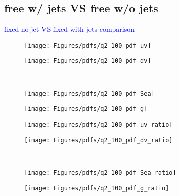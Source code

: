 \subsection{\as free w/ jets VS \as free w/o jets}
\label{subsec:asthunc}

\begin{center}
 \textcolor{blue}{\as fixed no jet VS \as fixed with jets comparison}
\end{center}
\begin{figure}[t]
 \begin{center}
\begin{subfloat}[]{\texttt{[image: Figures/pdfs/q2\_100\_pdf\_uv]}
   \label{fig:aschi2scanpdf_a}
 }%
\end{subfloat}
\begin{subfloat}[]{\texttt{[image: Figures/pdfs/q2\_100\_pdf\_dv]}
   \label{fig:aschi2scanpdf_b}
 }%
\end{subfloat}
\\
\begin{subfloat}[]{\texttt{[image: Figures/pdfs/q2\_100\_pdf\_Sea]}
   \label{fig:aschi2scanpdf_a}
 }%
\end{subfloat}
\begin{subfloat}[]{\texttt{[image: Figures/pdfs/q2\_100\_pdf\_g]}
   \label{fig:aschi2scanpdf_b}
 }%
\end{subfloat}
\end{center}
 \caption{}
 \label{fig:aschi2scanpdf}
\end{figure}

\newpage
\begin{figure}[t]
 \begin{center}
\begin{subfloat}[]{\texttt{[image: Figures/pdfs/q2\_100\_pdf\_uv\_ratio]}
   \label{fig:aschi2scanpdf_a}
 }%
\end{subfloat}
\begin{subfloat}[]{\texttt{[image: Figures/pdfs/q2\_100\_pdf\_dv\_ratio]}
   \label{fig:aschi2scanpdf_b}
 }%
\end{subfloat}
\\
\begin{subfloat}[]{\texttt{[image: Figures/pdfs/q2\_100\_pdf\_Sea\_ratio]}
   \label{fig:aschi2scanpdf_a}
 }%
\end{subfloat}
\begin{subfloat}[]{\texttt{[image: Figures/pdfs/q2\_100\_pdf\_g\_ratio]}
   \label{fig:aschi2scanpdf_b}
 }%
\end{subfloat}
\end{center}
 \caption{}
 \label{fig:aschi2scanpdf}
\end{figure}

